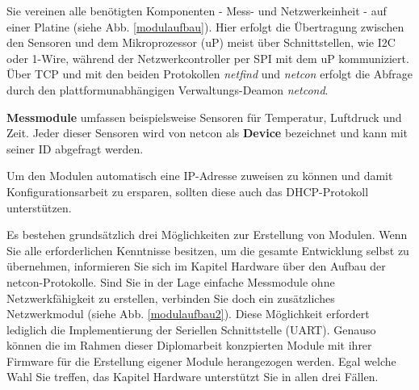 \documentclass[a4paper,14pt,headsepline]{scrartcl}
\begin{document}
\newpage

Sie vereinen alle benötigten Komponenten - Mess- und Netzwerkeinheit - auf einer Platine (siehe Abb. \ref{modulaufbau}). Hier erfolgt die Übertragung zwischen den Sensoren und dem Mikroprozessor (uP) meist über Schnittstellen, wie I2C oder 1-Wire, während der Netzwerkcontroller per SPI mit dem uP kommuniziert. Über TCP und mit den beiden Protokollen \textit{netfind} und \textit{netcon} erfolgt die Abfrage durch den plattformunabhängigen Verwaltungs-Deamon \textit{netcond}. 

\textbf{Messmodule} umfassen beispielsweise Sensoren für Temperatur, Luftdruck und Zeit. Jeder dieser Sensoren wird von netcon als \textbf{Device} bezeichnet und kann mit seiner ID abgefragt werden.

Um den Modulen automatisch eine IP-Adresse zuweisen zu können und damit Konfigurationsarbeit zu ersparen, sollten diese auch das DHCP-Protokoll unterstützen.

Es bestehen grundsätzlich drei Möglichkeiten zur Erstellung von Modulen. Wenn Sie alle erforderlichen Kenntnisse besitzen, um die gesamte Entwicklung selbst zu übernehmen, informieren Sie sich im Kapitel Hardware über den Aufbau der netcon-Protokolle. Sind Sie in der Lage einfache Messmodule ohne Netzwerkfähigkeit zu erstellen, verbinden Sie doch ein zusätzliches Netzwerkmodul (siehe Abb. \ref{modulaufbau2}). Diese Möglichkeit erfordert lediglich die Implementierung der Seriellen Schnittstelle (UART). Genauso können die im Rahmen dieser Diplomarbeit konzpierten Module mit ihrer Firmware für die Erstellung eigener Module herangezogen werden. Egal welche Wahl Sie treffen, das Kapitel Hardware unterstützt Sie in allen drei Fällen.

\begin{figure}[h]
\begin{center}
\end{center}
\end{figure}
\end{document}

